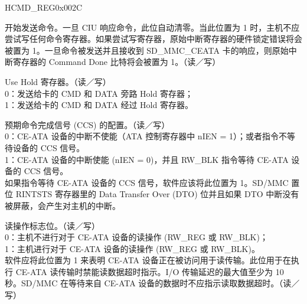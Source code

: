 \begin{register}{H}{CMD\_REG}{0x002C}\label{regdesc:CMDREG}
%
%
%
%
%
%
%
%
%
%
%
%
%
%
%
%
%
%
%
%
%
%
%
\regnewline%
\begin{regdesc}\begin{reglist}
\item [START\_CMD]开始发送命令。一旦 CIU 响应命令，此位自动清零。当此位置为 1 时，主机不应尝试写任何命令寄存器。如果尝试写寄存器，原始中断寄存器的硬件锁定错误将会被置为 1。一旦命令被发送并且接收到 SD\_MMC\_CEATA 卡的响应，则原始中断寄存器的 Command Done 比特将会被置为 1。（读／写）
\item [USE\_HOLE]Use Hold 寄存器。（读／写）\\
0：发送给卡的 CMD 和 DATA 旁路 Hold 寄存器；\\
1：发送给卡的 CMD 和 DATA 经过 Hold 寄存器。
\item [CCS\_EXPECTED] 预期命令完成信号 (CCS) 的配置。（读／写）\\
0：CE-ATA 设备的中断不使能（ATA 控制寄存器中 nIEN = 1）；或者指令不等待设备的 CCS 信号。\\
1：CE-ATA 设备的中断使能 (nIEN = 0)，并且 RW\_BLK 指令等待 CE-ATA 设备的 CCS 信号。\\
如果指令等待 CE-ATA 设备的 CCS 信号，软件应该将此位置为 1。SD/MMC 置位 RINTSTS 寄存器里的 Data Transfer Over (DTO) 位并且如果 DTO 中断没有被屏蔽，会产生对主机的中断。
\item [READ\_CEATA\_DEVICE] 读操作标志位。（读／写）\\
0：主机不进行对于 CE-ATA 设备的读操作 (RW\_REG 或 RW\_BLK)；\\
1：主机进行对于 CE-ATA 设备的读操作 (RW\_REG 或 RW\_BLK)。\\
软件应将此位置为 1 来表明 CE-ATA 设备正在被访问用于读传输。此位用于在执行 CE-ATA 读传输时禁能读数据超时指示。I/O 传输延迟的最大值至少为 10 秒。SD/MMC 在等待来自 CE-ATA 设备的数据时不应指示读取数据超时。（读／写）
\end{reglist}\end{regdesc}
\end{register}

